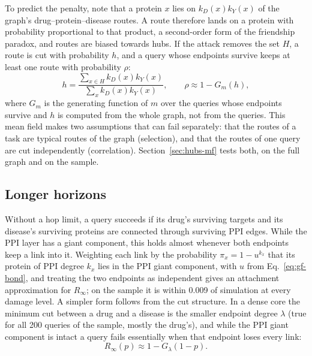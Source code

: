 To predict the penalty, note that a protein $x$ lies on $k_D(x)k_Y(x)$ of the
graph's drug--protein--disease routes. A route therefore lands on a protein
with probability proportional to that product, a second-order form of the
friendship paradox, and routes are biased towards hubs. If the attack removes
the set $H$, a route is cut with probability $h$, and a query whose endpoints
survive keeps at least one route with probability $\rho$:
\begin{equation}
h=\frac{\sum_{x\in H}k_D(x)k_Y(x)}{\sum_x k_D(x)k_Y(x)},
\qquad
\rho\approx1-G_m(h),
\label{eq:mf}
\end{equation}
where $G_m$ is the generating function of $m$ over the queries whose endpoints
survive and $h$ is computed from the whole graph, not from the queries. This
mean field makes two assumptions that can fail separately: that the routes of a
task are typical routes of the graph (selection), and that the routes of one
query are cut independently (correlation). Section~\ref{sec:hubs-mf}
tests both, on the full graph and on the sample.

\subsection{Longer horizons}
\label{sec:theory-rinf}

Without a hop limit, a query succeeds if its drug's surviving targets and its
disease's surviving proteins are connected through surviving PPI edges. While
the PPI layer has a giant component, this holds almost whenever both endpoints
keep a link into it. Weighting each link by the probability $\pi_x=1-u^{k_x}$
that its protein of PPI degree $k_x$ lies in the PPI giant component, with $u$
from Eq.~\eqref{eq:gf-bond}, and treating the two endpoints as independent gives
an attachment approximation for $R_\infty$; on the sample it is within 0.009 of
simulation at every damage level. A simpler form follows from the cut structure.
In a dense core the minimum cut between a drug and a disease is the smaller
endpoint degree $\lambda$ (true for all 200 queries of the sample, mostly the
drug's), and while the PPI giant component is intact a query fails essentially
when that endpoint loses every link:
\begin{equation}
R_\infty(p)\approx1-G_\lambda(1-p).
\label{eq:mincut}
\end{equation}

